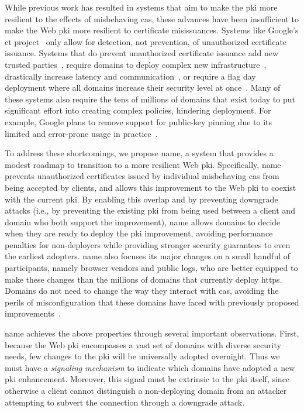 While previous work has resulted in systems that aim to make the \ac{pki} more
resilient to the effects of misbehaving \acp{ca}, these advances have been
insufficient to make the Web \ac{pki} more resilient to certificate
misissuances. Systems like Google's \ac{ct} project~\cite{rfc6962} only allow
for detection, not prevention, of unauthorized certificate issuance. Systems
that do prevent unauthorized certificate issuance add new trusted
parties~\cite{kim2013accountable}, require domains to deploy complex new
infrastructure~\cite{rfc6698, szalachowski2014policert}, drastically increase
latency and communication~\cite{yu2016dtki}, or require a flag day deployment
where all domains increase their security level at once~\cite{basin2014arpki}.
Many of these systems also require the tens of millions of domains that exist
today to put significant effort into creating complex policies, hindering
deployment. For example, Google plans to remove support for public-key pinning
due to its limited and error-prone usage in practice~\cite{palmer2017intent}.

To address these shortcomings, we propose \acs{name}, a system that provides a
modest roadmap to transition to a more resilient Web \ac{pki}. Specifically,
\ac{name} prevents unauthorized certificates issued by individual misbehaving
\acp{ca} from being accepted by clients, and allows this improvement to the Web
\ac{pki} to coexist with the current \ac{pki}. By enabling this overlap and by
preventing downgrade attacks (i.e., by preventing the existing \ac{pki} from
being used between a client and domain who both support the improvement),
\ac{name} allows domains to decide when they are ready to deploy the \ac{pki}
improvement, avoiding performance penalties for non-deployers while providing
stronger security guarantees to even the earliest adopters. \ac{name} also
focuses its major changes on a small handful of participants, namely browser
vendors and public logs, who are better equipped to make these changes than the
millions of domains that currently deploy \ac{https}. Domains do not need to
change the way they interact with \acp{ca}, avoiding the perils of
misconfiguration that these domains have faced with previously proposed
improvements~\cite{palmer2017intent}.

\ac{name} achieves the above properties through several important observations.
First, because the Web \ac{pki} encompasses a vast set of domains with diverse
security needs, few changes to the \ac{pki} will be universally adopted
overnight. Thus we must have a \emph{signaling mechanism} to indicate which
domains have adopted a new \ac{pki} enhancement. Moreover, this signal must be
extrinsic to the \ac{pki} itself, since otherwise a client cannot distinguish a
non-deploying domain from an attacker attempting to subvert the connection
through a downgrade attack.

